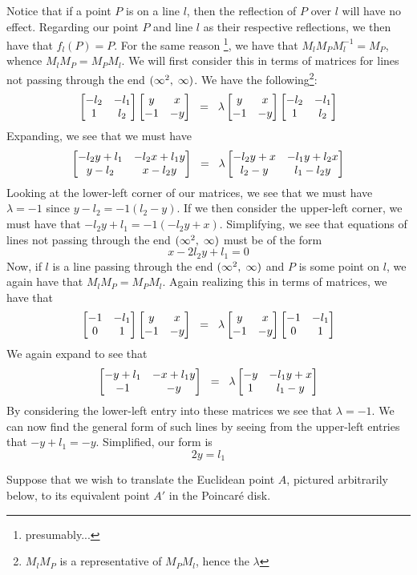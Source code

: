 \documentclass[12pt]{article}
\newcommand{\poincare}{Poincar\'{e} }
\newcommand{\inv}{^{-1}}
\newcommand{\spceq}{\hspace{2mm} = \hspace{2mm}}
\newcommand{\ttc}{, \hspace{1mm}}
\newcommand{\lftmat}[4]{\begin{bmatrix} {#1} & {#2} \\ {#3} & {#4} \end{bmatrix}}
\newcommand{\pointmat}[2]{\lftmat{{#2}}{{#1}}{-1}{-{#2}}}
\newcommand{\stanpointmat}{\pointmat{x}{y}}
\newcommand{\linenoendmat}[2]{\begin{bmatrix} -{#2} & -{#1} \\ 1 & {#2} \end{bmatrix}}
\newcommand{\stanlinenoendmat}{\linenoendmat{l_1}{l_2}}
\newcommand{\lineendmat}[2]{\begin{bmatrix} -1 & -{#1} \\ 0 & 1 \end{bmatrix}}
\newcommand{\stanlineendmat}{\lineendmat{l_1}{l_2}}
\newcommand{\specialend}{(\infty^2\ttc\infty)}
\theoremstyle{plain}
\theoremstyle{definition}
\begin{document}
Notice that if a point $P$ is on a line $l$, then the reflection of $P$ over $l$ will have no effect. Regarding our point $P$ and line $l$ as their respective reflections, we then have that $f_l(P) = P$. For the same reason \footnote{presumably...}, we have that $M_l M_P M_l\inv = M_P$, whence $M_l M_P = M_P M_l$. We will first consider this in terms of matrices for lines not passing through the end $\specialend$. We have the following\footnote{$M_l M_P$ is a representative of $M_P M_l$, hence the $\lambda$}:
\begin{equation} 
\stanlinenoendmat\stanpointmat \spceq \lambda \stanpointmat\stanlinenoendmat
\end{equation}	
Expanding, we see that we must have
	\[
		\lftmat{-l_2y+l_1}{-l_2x+l_1y}{y-l_2}{x-l_2y} \spceq \lambda \lftmat{-l_2y+x}{-l_1y+l_2x}{l_2-y}{l_1-l_2y}
	\]
Looking at the lower-left corner of our matrices, we see that we must have $\lambda = -1$ since $y - l_2 = -1(l_2 - y)$. If we then consider the upper-left corner, we must have that $-l_2y + l_1 = -1(-l_2y + x)$. Simplifying, we see that equations of lines not passing through the end $\specialend$ must be of the form
\begin{equation}
	x - 2l_2y + l_1  = 0
\end{equation} 
Now, if $l$ is a line passing through the end $\specialend$ and $P$ is some point on $l$, we again have that $M_l M_P = M_P M_l$. Again realizing this in terms of matrices, we have that 
\begin{equation} 
	\stanlineendmat\stanpointmat \spceq \lambda \stanpointmat\stanlineendmat
\end{equation}	
We again expand to see that 
	\[
		\lftmat{-y+l_1}{-x+l_1y}{-1}{-y} \spceq \lambda \lftmat{-y}{-l_1y+x}{1}{l_1-y}
	\]
By considering the lower-left entry into these matrices we see that $\lambda = -1$. We can now find the general form of such lines by seeing from the upper-left entries that $-y+l_1 = -y$. Simplified, our form is 
\begin{equation}
	2y = l_1
\end{equation} 



\newpage

\noindent Suppose that we wish to translate the Euclidean point $A$, pictured arbitrarily below, to its equivalent point $A'$ in the \poincare disk.
\end{document}
